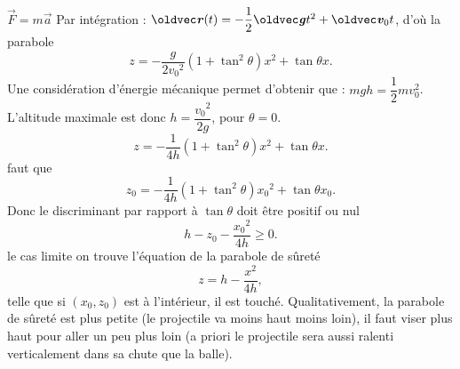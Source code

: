\begin{solution}
\begin{questions}
    \questioncours $\vec{F} = m\vec{a}$
    \question Par intégration : $\vr(t) = -\dfrac{1}{2}\vg t^2 + \vv_0 t$, d'où la parabole
    $$z = -\dfrac{g}{2 {v_0}^2}(1 + \tan^2\theta)x^2 + \tan\theta x.$$
    \question Une considération d'énergie mécanique permet d'obtenir que : $m g h = \dfrac{1}{2}m v_0^2$. L'altitude maximale est donc $h = \dfrac{{v_0}^2}{2g}$, pour $\theta = 0$.
    \question 
    $$z = -\dfrac{1}{4 h}(1 + \tan^2\theta)x^2 + \tan\theta x.$$
     \questionIl faut que
    $$z_0 = -\dfrac{1}{4 h}(1 + \tan^2\theta){x_0}^2 + \tan\theta x_0.$$
    Donc le discriminant par rapport à $\tan\theta$ doit être positif ou nul
    $$h - z_0 - \dfrac{{x_0}^2}{4 h} \geqslant 0.$$
   \questionPour le cas limite on trouve l'équation de la parabole de sûreté
    $$z = h - \dfrac{x^2}{4 h},$$
    telle que si $(x_0,z_0)$ est à l'intérieur, il est touché.
    \question Qualitativement, la parabole de sûreté est plus petite (le projectile va moins haut moins loin), il faut viser plus haut pour aller un peu plus loin (a priori le projectile sera aussi ralenti verticalement dans sa chute que la balle).
\end{questions}
\end{solution}




